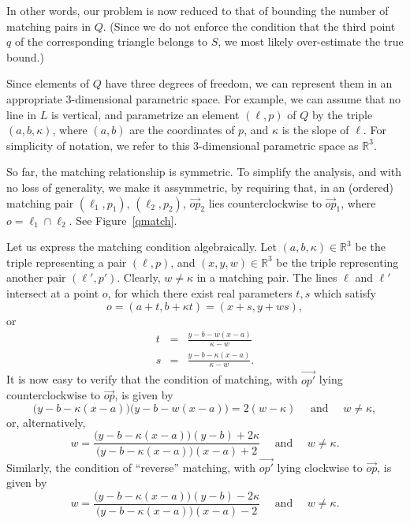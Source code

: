 \documentclass[12pt]{article}
\def\reals{{\mathbb R}}
\begin{document}
In other words, our problem is now reduced to that of bounding the 
number of matching pairs in $Q$. (Since we do not enforce the condition 
that the third point $q$ of the corresponding triangle belongs to $S$, 
we most likely over-estimate the true bound.) 

Since elements of $Q$ have three degrees of freedom, we can represent
them in an appropriate 3-dimensional parametric space. For example,
we can assume that no line in $L$ is vertical, and parametrize an
element $(\ell,p)$ of $Q$ by the triple $(a,b,\kappa)$, where
$(a,b)$ are the coordinates of $p$, and $\kappa$ is the slope
of $\ell$. For simplicity of notation, we refer to this 3-dimensional
parametric space as $\reals^3$.

So far, the matching relationship is symmetric. To simplify the
analysis, and with no loss of generality, we make it assymmetric, by
requiring that, in an (ordered) matching pair
$(\ell_1,p_1)$, $(\ell_2,p_2)$, $\vec{op}_2$ lies counterclockwise to
$\vec{op}_1$, where $o=\ell_1\cap\ell_2$. See Figure~\ref{qmatch}.

Let us express the matching condition algebraically.
Let $(a,b,\kappa) \in \reals^3$ be the triple representing a pair
$(\ell,p)$, and $(x,y,w) \in \reals^3$ be the triple representing
another pair $(\ell',p')$.
Clearly, $w \not= \kappa$ in a matching pair.
The lines $\ell$ and $\ell'$ intersect at a point $o$, for which
there exist real parameters $t,s$ which satisfy
$$
o = (a+t,b+\kappa t) = (x+s,y+ws) ,
$$
or
\begin{eqnarray*}
t & = & \frac{y-b-w(x-a)}{\kappa-w} \\
s & = & \frac{y-b-\kappa(x-a)}{\kappa-w} .
\end{eqnarray*}
It is now easy to verify that the condition of matching, with
$\vec{op'}$ lying counterclockwise to $\vec{op}$, is given by
$$
\biggl( y-b-\kappa(x-a) \biggr)
\biggl( y-b-w(x-a) \biggr) = 2(w-\kappa) \quad \mbox{ and } \quad
w \not= \kappa,
$$
or, alternatively,
\begin{equation} \label{eq:m1}
w = \frac
{ \biggl(y-b-\kappa(x-a)\biggr) (y-b) + 2\kappa }
{ \biggl(y-b-\kappa(x-a)\biggr) (x-a) + 2 } \quad \mbox{ and } \quad
w \not= \kappa.
\end{equation}
Similarly, the condition of ``reverse'' matching, with $\vec{op'}$
lying clockwise to $\vec{op}$, is given by
\begin{equation} \label{eq:m1'}
w = \frac
{ \biggl(y-b-\kappa(x-a)\biggr) (y-b) - 2\kappa }
{ \biggl(y-b-\kappa(x-a)\biggr) (x-a) - 2 } \quad \mbox{ and } \quad
w \not= \kappa.
\end{equation}
\end{document}

